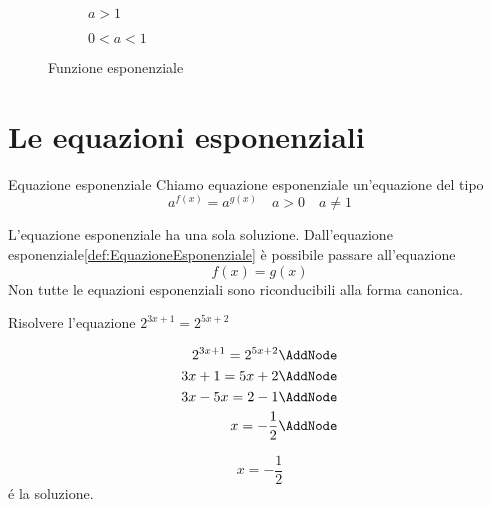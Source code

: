 \begin{figure}
	\centering
	\begin{subfigure}[b]{.4\linewidth}
		\centering
		
		\caption{$a>1$}
		\label{fig:funzioniEsempio6}
	\end{subfigure}\qquad
	\centering
	\begin{subfigure}[b]{.4\linewidth}
		\centering
		
		\caption{$0<a<1$}
		\label{fig:funzioniEsempio7}
	\end{subfigure}%
		\caption{Funzione esponenziale}
		\label{fig:funzExp2}
\end{figure}
\section{Le equazioni esponenziali}
\label{sec:LeEquazioniEsponenziali}
\begin{definizionet}{Equazione esponenziale}{}\label{def:EquazioneEsponenziale}
Chiamo equazione esponenziale un'equazione del tipo \[a^{f(x)}=a^{g(x)}\quad a>0\quad  a\neq1 \]
\end{definizionet}
L'equazione esponenziale ha una sola soluzione. 
Dall'equazione esponenziale\nobs\vref{def:EquazioneEsponenziale} è possibile passare all'equazione \[f(x)=g(x) \]Non tutte le equazioni esponenziali sono riconducibili alla forma canonica.
\begin{esempiot}
	Risolvere l'equazione $2^{3x+1}=2^{5x+2} $
\end{esempiot}
\begin{NodesList}[margin=4cm]
\begin{align*}
2^{3x+1}=2^{5x+2}\AddNode\\
3x+1=5x+2\AddNode\\
3x-5x=2-1\AddNode\\
x=-\dfrac{1}{2}\AddNode
\end{align*}
%
%
%
\end{NodesList}
\[x=-\dfrac{1}{2}\]
\'{e} la soluzione.

